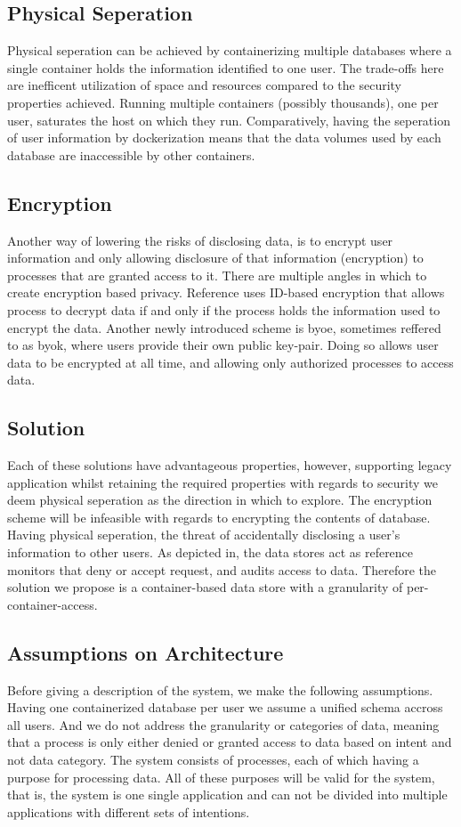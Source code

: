 \documentclass[USenglish]{uit-thesis}
\begin{document}
\subsection{Physical Seperation}
Physical seperation can be achieved by containerizing multiple databases where
a single container holds the information identified to one user.
The trade-offs here are inefficent utilization of space and resources compared to
the security properties achieved.
Running multiple containers (possibly thousands), one per user, saturates
the host on which they run.
Comparatively, having the seperation of user information by dockerization means
that the data volumes used by each database are inaccessible by other containers.

\subsection{Encryption}
Another way of lowering the risks of disclosing data, is to encrypt user information
and only allowing disclosure of that information (encryption) to processes that
are granted access to it.
There are multiple angles in which to create encryption based privacy.
Reference uses ID-based encryption that allows process to decrypt data if and only if
the process holds the information used to encrypt the data.
Another newly introduced scheme is \gls{byoe}, sometimes reffered to as \gls{byok},
where users provide their own public key-pair.
Doing so allows user data to be encrypted at all time, and allowing only authorized
processes to access data.

\subsection{Solution}
Each of these solutions have advantageous properties, however, supporting
legacy application whilst retaining the required properties with regards to security we deem
physical seperation as the direction in which to explore.
The encryption scheme will be infeasible with regards to encrypting the contents of database.
Having physical seperation, the threat of accidentally disclosing a user's information
to other users.
As depicted in, the data stores act as reference monitors that deny or accept request, and
audits access to data.
Therefore the solution we propose is a container-based data store with a granularity
of per-container-access.

\subsection{Assumptions on Architecture}
Before giving a description of the system, we make the following assumptions.
Having one containerized database per user we assume a unified schema accross
all users.
And we do not address the granularity or categories of data, meaning that
a process is only either denied or granted access to data based on intent and not data category.
The system consists of processes, each of which having a purpose for processing data.
All of these purposes will be valid for the system, that is,
the system is one single application and can not be divided into multiple applications
with different sets of intentions.
\end{document}
